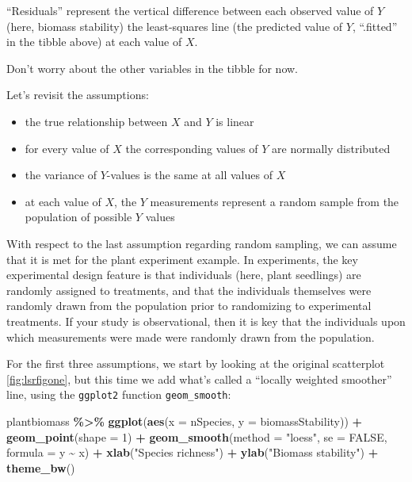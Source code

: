 \documentclass[
]{book}
\newenvironment{Shaded}{\begin{snugshade}}{\end{snugshade}}
\newcommand{\AttributeTok}[1]{\textcolor[rgb]{0.13,0.29,0.53}{#1}}
\newcommand{\ConstantTok}[1]{\textcolor[rgb]{0.56,0.35,0.01}{#1}}
\newcommand{\DecValTok}[1]{\textcolor[rgb]{0.00,0.00,0.81}{#1}}
\newcommand{\FunctionTok}[1]{\textcolor[rgb]{0.13,0.29,0.53}{\textbf{#1}}}
\newcommand{\NormalTok}[1]{#1}
\newcommand{\SpecialCharTok}[1]{\textcolor[rgb]{0.81,0.36,0.00}{\textbf{#1}}}
\newcommand{\StringTok}[1]{\textcolor[rgb]{0.31,0.60,0.02}{#1}}
\providecommand{\tightlist}{%
  \setlength{\itemsep}{0pt}\setlength{\parskip}{0pt}}
\begin{document}
``Residuals'' represent the vertical difference between each observed value of \(Y\) (here, biomass stability) the least-squares line (the predicted value of \(Y\), ``.fitted'' in the tibble above) at each value of \(X\).

Don't worry about the other variables in the tibble for now.

Let's revisit the assumptions:

\begin{itemize}
\tightlist
\item
  the true relationship between \(X\) and \(Y\) is linear\\
\item
  for every value of \(X\) the corresponding values of \(Y\) are normally distributed\\
\item
  the variance of \(Y\)-values is the same at all values of \(X\)
\item
  at each value of \(X\), the \(Y\) measurements represent a random sample from the population of possible \(Y\) values
\end{itemize}

With respect to the last assumption regarding random sampling, we can assume that it is met for the plant experiment example. In experiments, the key experimental design feature is that individuals (here, plant seedlings) are randomly assigned to treatments, and that the individuals themselves were randomly drawn from the population prior to randomizing to experimental treatments. If your study is observational, then it is key that the individuals upon which measurements were made were randomly drawn from the population.

For the first three assumptions, we start by looking at the original scatterplot \ref{fig:lsrfigone}, but this time we add what's called a ``locally weighted smoother'' line, using the \texttt{ggplot2} function \texttt{geom\_smooth}:

\begin{Shaded}
\begin{Highlighting}[]
\NormalTok{plantbiomass }\SpecialCharTok{\%\textgreater{}\%}
\FunctionTok{ggplot}\NormalTok{(}\FunctionTok{aes}\NormalTok{(}\AttributeTok{x =}\NormalTok{ nSpecies, }\AttributeTok{y =}\NormalTok{ biomassStability)) }\SpecialCharTok{+}
  \FunctionTok{geom\_point}\NormalTok{(}\AttributeTok{shape =} \DecValTok{1}\NormalTok{) }\SpecialCharTok{+}
  \FunctionTok{geom\_smooth}\NormalTok{(}\AttributeTok{method =} \StringTok{"loess"}\NormalTok{, }\AttributeTok{se =} \ConstantTok{FALSE}\NormalTok{, }\AttributeTok{formula =}\NormalTok{ y }\SpecialCharTok{\textasciitilde{}}\NormalTok{ x) }\SpecialCharTok{+}
  \FunctionTok{xlab}\NormalTok{(}\StringTok{"Species richness"}\NormalTok{) }\SpecialCharTok{+}
  \FunctionTok{ylab}\NormalTok{(}\StringTok{"Biomass stability"}\NormalTok{) }\SpecialCharTok{+}
  \FunctionTok{theme\_bw}\NormalTok{()}
\end{Highlighting}
\end{Shaded}
\end{document}
